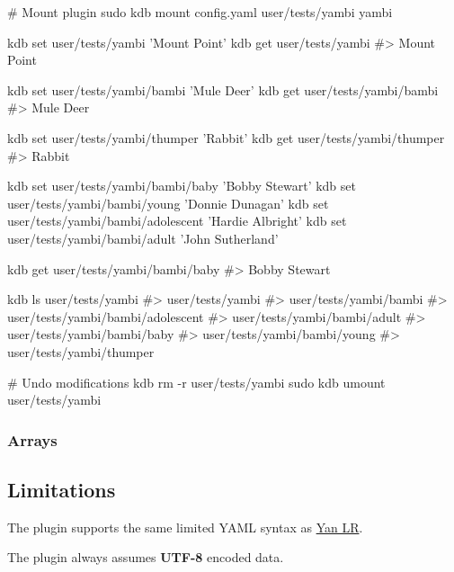\begin{DoxyCode}
# Mount plugin
sudo kdb mount config.yaml user/tests/yambi yambi

kdb set user/tests/yambi 'Mount Point'
kdb get user/tests/yambi
#> Mount Point

kdb set user/tests/yambi/bambi 'Mule Deer'
kdb get user/tests/yambi/bambi
#> Mule Deer

kdb set user/tests/yambi/thumper 'Rabbit'
kdb get user/tests/yambi/thumper
#> Rabbit

kdb set user/tests/yambi/bambi/baby 'Bobby Stewart'
kdb set user/tests/yambi/bambi/young 'Donnie Dunagan'
kdb set user/tests/yambi/bambi/adolescent 'Hardie Albright'
kdb set user/tests/yambi/bambi/adult 'John Sutherland'

kdb get user/tests/yambi/bambi/baby
#> Bobby Stewart

kdb ls user/tests/yambi
#> user/tests/yambi
#> user/tests/yambi/bambi
#> user/tests/yambi/bambi/adolescent
#> user/tests/yambi/bambi/adult
#> user/tests/yambi/bambi/baby
#> user/tests/yambi/bambi/young
#> user/tests/yambi/thumper

# Undo modifications
kdb rm -r user/tests/yambi
sudo kdb umount user/tests/yambi
\end{DoxyCode}


\subsubsection*{Arrays}




\subsection*{Limitations}

The plugin supports the same limited Y\+A\+ML syntax as \hyperlink{md_src_plugins_yanlr_README_src_plugins_yanlr_README_md}{Yan LR}.


\begin{DoxyItemize}
\item The plugin always assumes {\bfseries U\+T\+F-\/8} encoded data. 
\end{DoxyItemize}